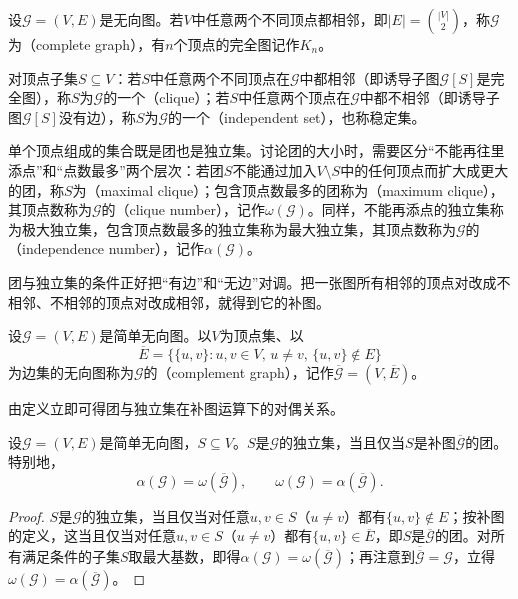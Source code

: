 \begin{definition}
\label{def:graph-clique-independent}
设$\mathcal G=(V,E)$是无向图。若$V$中任意两个不同顶点都相邻，即$|E|=\binom{|V|}{2}$，称$\mathcal G$为（complete graph），有$n$个顶点的完全图记作$K_n$。

对顶点子集$S\subseteq V$：若$S$中任意两个不同顶点在$\mathcal G$中都相邻（即诱导子图$\mathcal G[S]$是完全图），称$S$为$\mathcal G$的一个（clique）；若$S$中任意两个顶点在$\mathcal G$中都不相邻（即诱导子图$\mathcal G[S]$没有边），称$S$为$\mathcal G$的一个（independent set），也称稳定集。
\end{definition}

单个顶点组成的集合既是团也是独立集。讨论团的大小时，需要区分“不能再往里添点”和“点数最多”两个层次：若团$S$不能通过加入$V\setminus S$中的任何顶点而扩大成更大的团，称$S$为（maximal clique）；包含顶点数最多的团称为（maximum clique），其顶点数称为$\mathcal G$的（clique number），记作$\omega(\mathcal G)$。同样，不能再添点的独立集称为极大独立集，包含顶点数最多的独立集称为最大独立集，其顶点数称为$\mathcal G$的（independence number），记作$\alpha(\mathcal G)$。

团与独立集的条件正好把“有边”和“无边”对调。把一张图所有相邻的顶点对改成不相邻、不相邻的顶点对改成相邻，就得到它的补图。

\begin{definition}[补图]
\label{def:graph-complement}
设$\mathcal G=(V,E)$是简单无向图。以$V$为顶点集、以
\[
\overline E=\bigl\{\{u,v\}:u,v\in V,\,u\neq v,\,\{u,v\}\notin E\bigr\}
\]
为边集的无向图称为$\mathcal G$的（complement graph），记作$\overline{\mathcal G}=(V,\overline E)$。
\end{definition}

由定义立即可得团与独立集在补图运算下的对偶关系。

\begin{theorem}[团与独立集的补图对偶]
\label{thm:graph-clique-independent-complement}
设$\mathcal G=(V,E)$是简单无向图，$S\subseteq V$。$S$是$\mathcal G$的独立集，当且仅当$S$是补图$\overline{\mathcal G}$的团。特别地，
\begin{equation}
\alpha(\mathcal G)=\omega(\overline{\mathcal G}),\qquad
\omega(\mathcal G)=\alpha(\overline{\mathcal G}).
\label{eq:graph-clique-independent-complement}
\end{equation}
\end{theorem}

\begin{proof}
$S$是$\mathcal G$的独立集，当且仅当对任意$u,v\in S$（$u\neq v$）都有$\{u,v\}\notin E$；按补图的定义，这当且仅当对任意$u,v\in S$（$u\neq v$）都有$\{u,v\}\in\overline E$，即$S$是$\overline{\mathcal G}$的团。对所有满足条件的子集$S$取最大基数，即得$\alpha(\mathcal G)=\omega(\overline{\mathcal G})$；再注意到$\overline{\overline{\mathcal G}}=\mathcal G$，立得$\omega(\mathcal G)=\alpha(\overline{\mathcal G})$。
\end{proof}

